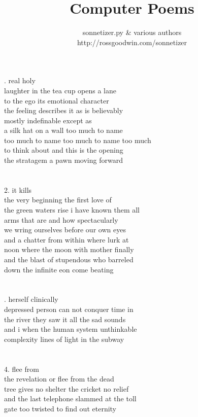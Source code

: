 \documentclass{article}
\title{Computer Poems}
\author{sonnetizer.py \& various authors\\
http://rossgoodwin.com/sonnetizer}
\date{}
\begin{document}
\maketitle

. real holy\\
laughter in the tea cup opens a lane\\
to the ego its emotional character\\
the feeling describes it as is believably\\
mostly indefinable except as\\
a silk hat on a wall too much to name\\
too much to name too much to name too much\\
to think about and this is the opening\\
the stratagem a pawn moving forward\\
\\
\\
2. it kills\\
the very beginning the first love of\\
the green waters rise i have known them all\\
arms that are and how spectacularly\\
we wring ourselves before our own eyes\\
and a chatter from within where lurk at\\
noon where the moon with mother finally\\
and the blast of stupendous who barreled\\
down the infinite eon come beating\\
\\
\\
\newpage
{}. herself clinically\\
depressed person can not conquer time in\\
the river they saw it all the sad sounds\\
and i when the human system unthinkable\\
complexity lines of light in the subway\\
\\
\\
4. flee from\\
the revelation or flee from the dead\\
tree gives no shelter the cricket no relief\\
and the last telephone slammed at the toll\\
gate too twisted to find out eternity\\
\end{document}
